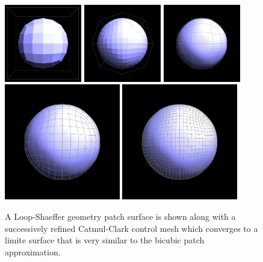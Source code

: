 \documentclass[12pt, letterpaper]{article}
\begin{document}
		\begin{figure}[h]
		\centering
		\includegraphics[width=0.3\textwidth]{cube_0p}
		\includegraphics[width=0.3\textwidth]{cube_1p}
		\includegraphics[width=0.3\textwidth]{cube_2p}
		\includegraphics[width=0.45\textwidth]{cube_3p}
		\includegraphics[width=0.45\textwidth]{cube_4p}

		\caption{A Loop-Shaeffer geometry patch surface is shown along with a successively refined Catmul-Clark control mesh which converges to
		a limite surface that is very similar to the bicubic patch approximation.}
		\label{fig:Catmull-Clark}
		\end{figure}
\end{document}
